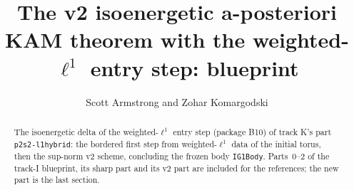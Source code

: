 \documentclass[11pt]{amsart}
\title{The v2 isoenergetic a-posteriori KAM theorem with the weighted-$\ell^1$ entry step: blueprint}
\author{Scott Armstrong and Zohar Komargodski}
\begin{document}
\begin{abstract}
The isoenergetic delta of the weighted-$\ell^1$ entry step (package B10) of track K's part \texttt{p2s2-l1hybrid}: the bordered first step from
weighted-$\ell^1$ data of the initial torus, then the sup-norm v2 scheme, concluding the frozen body \texttt{IG1Body}. Parts~0--2 of the track-I
blueprint, its sharp part and its v2 part are included for the references; the new part is the last section.
\end{abstract}
\maketitle
\tableofcontents






\end{document}
